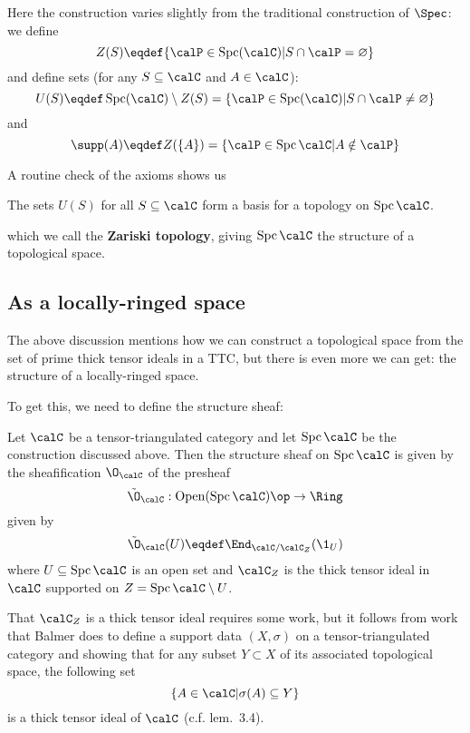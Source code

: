\documentclass[12pt]{article}
\DeclareMathOperator{\Spc}{Spc}
\begin{document}
Here the construction varies slightly from the traditional construction of $\Spec$: we define 
\[Z(S)\eqdef\{\calP\in\Spc(\calC)|S\cap\calP=\varnothing\}\]
and define sets (for any $S\subseteq\calC$ and $A\in \calC$):
\[U(S)\eqdef \Spc(\calC)\setminus Z(S)=\{\calP\in\Spc(\calC)|S\cap \calP\ne\varnothing\}\]
and
\[\supp(A)\eqdef Z(\{A\})=\{\calP\in\Spc\calC|A\notin \calP\}\]

A routine check of the axioms shows us
\begin{lem}
	The sets $U(S)$ for all $S\subseteq\calC$ form a basis for a topology on $\Spc\calC$.
\end{lem}
which we call the \textbf{Zariski topology}, giving $\Spc\calC$ the structure of a topological space.

\subsection{As a locally-ringed space}
The above discussion mentions how we can construct a topological space from the set of prime thick tensor ideals 
in a TTC, but there is even more we can get: the structure of a locally-ringed space. 

To get this, we need to define the structure sheaf:
\begin{defn}
	Let $\calC$ be a tensor-triangulated category and let $\Spc\calC$ be the construction discussed above. Then the structure sheaf on $\Spc\calC$ is given by the 
	sheafification $\O_\calC$ of the presheaf 
	\[\tilde\O_\calC:\operatorname{Open}(\Spc\calC)\op\to \Ring\]
	given by 
	\[\tilde\O_\calC(U)\eqdef \End_{\calC/\calC_Z}(\1_U)\]
	where $U\subseteq\Spc\calC$ is an open set and $\calC_Z$ is the thick tensor ideal in $\calC$ supported 
	on $Z=\Spc\calC\setminus U$.
\end{defn}

\begin{rmk}
	That $\calC_Z$ is a thick tensor ideal requires some work, but it follows from work that Balmer does to 
	define a support data $(X,\sigma)$ on a tensor-triangulated category and showing that for any subset $Y\subset X$ of 
	its associated topological space, the following set 
	\[\{A\in\calC|\sigma(A)\subseteq Y\}\]
	is a thick tensor ideal of $\calC$ (c.f. lem.~3.4).
\end{rmk}
\newpage
\end{document}
